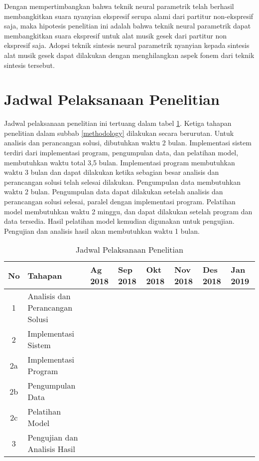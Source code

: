 Dengan mempertimbangkan bahwa teknik neural parametrik telah berhasil membangkitkan suara nyanyian ekspresif serupa alami dari partitur non-ekspresif saja, maka hipotesis penelitian ini adalah bahwa teknik neural parametrik dapat membangkitkan suara ekspresif untuk alat musik gesek dari partitur non ekspresif saja. Adopsi teknik sintesis neural parametrik nyanyian kepada sintesis alat musik gesek dapat dilakukan dengan menghilangkan aspek fonem dari teknik sintesis tersebut.

\section{Jadwal Pelaksanaan Penelitian}

Jadwal pelaksanaan penelitian ini tertuang dalam tabel \ref{tab-schedule}. Ketiga tahapan penelitian dalam subbab \ref{methodology} dilakukan secara berurutan. Untuk analisis dan perancangan solusi, dibutuhkan waktu 2 bulan.  Implementasi sistem terdiri dari implementasi program, pengumpulan data, dan pelatihan model, membutuhkan waktu total 3,5 bulan. Implementasi program membutuhkan waktu 3 bulan dan dapat dilakukan ketika sebagian besar analisis dan perancangan solusi telah selesai dilakukan. Pengumpulan data membutuhkan waktu 2 bulan. Pengumpulan data dapat dilakukan setelah analisis dan perancangan solusi selesai, paralel dengan implementasi program. Pelatihan model membutuhkan waktu 2 minggu, dan dapat dilakukan setelah program dan data tersedia. Hasil pelatihan model kemudian digunakan untuk pengujian. Pengujian dan analisis hasil akan membutuhkan waktu 1 bulan.

\begin{table}[h]
	\centering
    \caption{Jadwal Pelaksanaan Penelitian}\label{tab-schedule}
	\begin{tabular}{ |c|l|p{5px}|p{5px}|p{5px}|p{5px}|p{5px}|p{5px}|p{5px}|p{5px}|p{5px}|p{5px}|p{5px}|p{5px}| } 
	\hline
	No & Tahapan & \multicolumn{2}{p{10px}|}{Ag 2018} & \multicolumn{2}{p{10px}|}{Sep 2018} & \multicolumn{2}{p{10px}|}{Okt 2018} & \multicolumn{2}{p{10px}|}{Nov 2018} & \multicolumn{2}{p{10px}|}{Des 2018}  & \multicolumn{2}{p{10px}|}{Jan 2019} \\
	\hline
	1 & Analisis dan Perancangan Solusi & \fillcell & \fillcell & \fillcell & \fillcell & & & & & & & & \\
	\hline
	2 & Implementasi Sistem& & & & \fillcell & \fillcell &\fillcell &\fillcell &\fillcell &\fillcell &\fillcell & & \\
	\hline
	2a & \quad Implementasi Program & & & & \fillcell & \fillcell &\fillcell &\fillcell &\fillcell &\fillcell & & & \\
	\hline
	2b & \quad Pengumpulan Data & & & & & \fillcell &\fillcell &\fillcell &\fillcell & & & & \\
	\hline
	2c & \quad Pelatihan Model & & & & &  & & & & &\fillcell & & \\
	\hline
	3 & Pengujian dan Analisis Hasil & & & & &  & & & & & &\fillcell &\fillcell \\
	\hline
	\end{tabular}
	
\end{table}